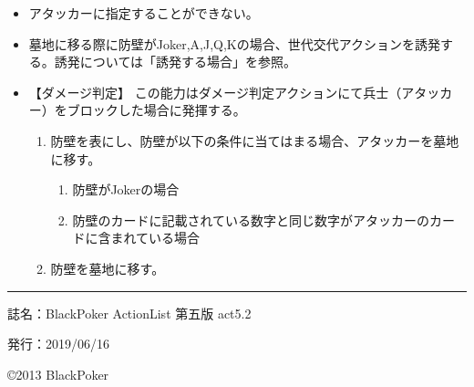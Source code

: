 \documentclass[twocolumn,a5paper,papersize,10pt]{jarticle}
\begin{document}
\vspace{-1zh}%
\begin{itemize}
\setlength{\leftskip}{-0.3cm}
\setlength{\parskip}{0pt} %

\item アタッカーに指定することができない。

\item 墓地に移る際に防壁がJoker,A,J,Q,Kの場合、世代交代アクションを誘発する。誘発については「誘発する場合」を参照。

\item 【ダメージ判定】 この能力はダメージ判定アクションにて兵士（アタッカー）をブロックした場合に発揮する。

\vspace{-1zh}%
\begin{enumerate}
\setlength{\leftskip}{-0.3cm}
\setlength{\parskip}{0pt} %

\item 防壁を表にし、防壁が以下の条件に当てはまる場合、アタッカーを墓地に移す。

\begin{enumerate}
\renewcommand{\labelenumi}{\Alph{enumi}}
\setlength{\leftskip}{-0.3cm}
\setlength{\parskip}{0pt} %

\item 防壁がJokerの場合

\item 防壁のカードに記載されている数字と同じ数字がアタッカーのカードに含まれている場合

\end{enumerate}
\item 防壁を墓地に移す。
\vspace{-1zh}%
\end{enumerate}\vspace{-1zh}%
\end{itemize}


\thispagestyle{empty}
\begin{flushright}
\begin{minipage}{0.8\hsize}
\hrule height 0.2mm depth 0mm width 50mm %
\begin{description}
  \item{誌名：}BlackPoker ActionList 第五版 act5.2
  \item{発行：}2019/06/16
\end{description}
\end{minipage}
\end{flushright}

\begin{flushright}
\copyright 2013 BlackPoker
\end{flushright}
\end{document}
